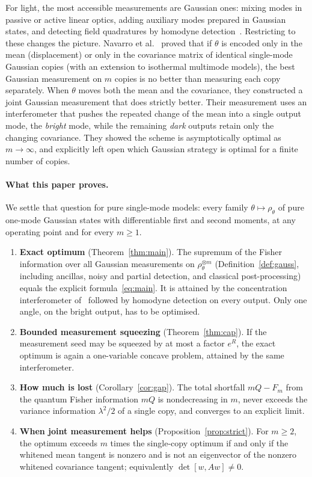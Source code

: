 \documentclass[11pt,a4paper]{article}
\theoremstyle{definition}\newtheorem{definition}{Definition}
\theoremstyle{remark}\newtheorem{remark}{Remark}
\begin{document}
For light, the most accessible measurements are Gaussian ones: mixing modes in passive or active linear optics, adding auxiliary modes prepared in Gaussian states, and detecting field quadratures by homodyne detection~\cite{Serafini2017}. Restricting to these changes the picture. Navarro et al.~\cite{Navarro2025} proved that if $\theta$ is encoded only in the mean (displacement) or only in the covariance matrix of identical single-mode Gaussian copies (with an extension to isothermal multimode models), the best Gaussian measurement on $m$ copies is no better than measuring each copy separately. When $\theta$ moves both the mean and the covariance, they constructed a joint Gaussian measurement that does strictly better. Their measurement uses an interferometer that pushes the repeated change of the mean into a single output mode, the \emph{bright} mode, while the remaining \emph{dark} outputs retain only the changing covariance. They showed the scheme is asymptotically optimal as $m\to\infty$, and explicitly left open which Gaussian strategy is optimal for a finite number of copies.

\paragraph{What this paper proves.}
We settle that question for pure single-mode models: every family $\theta\mapsto\rho_\theta$ of pure one-mode Gaussian states with differentiable first and second moments, at any operating point and for every $m\ge1$.
\begin{enumerate}[label=(\roman*)]
\item \textbf{Exact optimum} (Theorem~\ref{thm:main}). The supremum of the Fisher information over all Gaussian measurements on $\rho_\theta^{\otimes m}$ (Definition~\ref{def:gauss}, including ancillas, noisy and partial detection, and classical post-processing) equals the explicit formula~\eqref{eq:main}. It is attained by the concentration interferometer of~\cite{Navarro2025} followed by homodyne detection on every output. Only one angle, on the bright output, has to be optimised.
\item \textbf{Bounded measurement squeezing} (Theorem~\ref{thm:cap}). If the measurement seed may be squeezed by at most a factor $e^{R}$, the exact optimum is again a one-variable concave problem, attained by the same interferometer.
\item \textbf{How much is lost} (Corollary~\ref{cor:gap}). The total shortfall $mQ-F_m$ from the quantum Fisher information $mQ$ is nondecreasing in $m$, never exceeds the variance information $\lambda^2/2$ of a single copy, and converges to an explicit limit.
\item \textbf{When joint measurement helps} (Proposition~\ref{prop:strict}). For $m\ge2$, the optimum exceeds $m$ times the single-copy optimum if and only if the whitened mean tangent is nonzero and is not an eigenvector of the nonzero whitened covariance tangent; equivalently $\det[w,Aw]\ne0$.
\end{enumerate}
\end{document}

